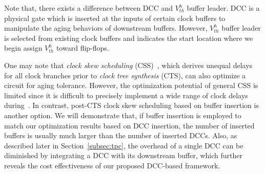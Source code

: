 Note that, there exists a difference between DCC and $V_{th}^{h}$ buffer leader. DCC is a physical gate which is inserted at the inputs of certain clock buffers to manipulate the aging behaviors of downstream buffers. However, $V_{th}^{h}$ buffer leader is selected from existing clock buffers and indicates the start location where we begin assign $V_{th}^{h}$ toward flip-flops. 


One may note that \textit{clock skew scheduling} (CSS)~\cite{fishburn1990clock}, which derives unequal delays for all clock branches prior to \textit{clock tree synthesis} (CTS), can also optimize a circuit for aging tolerance. However, the optimization potential of general CSS is limited since it is difficult to precisely implement a wide range of clock delays during~\cite{li2011optimal}. In contrast, post-CTS clock skew scheduling based on buffer insertion is another option. We will demonstrate that, if buffer insertion is employed to match our optimization results based on DCC insertion, the number of inserted buffers is usually much larger than the number of inserted DCCs. Also, as described later in Section~\ref{subsec:tpc}, the overhead of a single DCC can be diminished by integrating a DCC with its downstream buffer, which further reveals the cost effectiveness of our proposed DCC-based framework.

